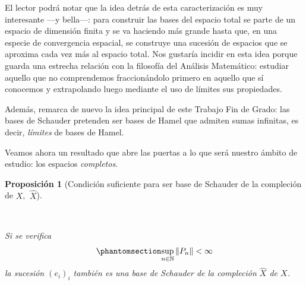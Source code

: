 \documentclass[
  spanish,
  letterpaper,
  DIV=11,
  numbers=noendperiod]{scrreprt}
\newtheorem{proposition}[theorem]{Proposición}
\theoremstyle{definition}
\theoremstyle{remark}
\theoremstyle{definition}
\theoremstyle{exampstyle}
\theoremstyle{plain}
\theoremstyle{plain}
\newtheorem{proposition}{Proposición}[chapter]
\theoremstyle{definition}
\theoremstyle{plain}
\theoremstyle{remark}
\begin{document}
El lector podrá notar que la idea detrás de esta caracterización es muy
interesante ---y bella---: para construir las bases del espacio total se
parte de un espacio de dimensión finita y se va haciendo más grande
hasta que, en una especie de convergencia espacial, se construye una
sucesión de espacios que se aproxima cada vez más al espacio total. Nos
gustaría incidir en esta idea porque guarda una estrecha relación con la
filosofía del Análisis Matemático: estudiar aquello que no comprendemos
fraccionándolo primero en aquello que sí conocemos y extrapolando luego
mediante el uso de límites sus propiedades.

Además, remarca de nuevo la idea principal de este Trabajo Fin de Grado:
las bases de Schauder pretenden ser bases de Hamel que admiten sumas
infinitas, es decir, \emph{límites} de bases de Hamel.

Veamos ahora un resultado que abre las puertas a lo que será nuestro
ámbito de estudio: los espacios \emph{completos}.

\begin{proposition}[Condición suficiente para ser base de Schauder de la
compleción de \(X\),
\(\ \widehat X\)]\protect\hypertarget{prp-1.4}{}\label{prp-1.4}

~

\hspace*{1mm}

Si se verifica
\begin{equation}\protect\phantomsection\label{eq-acotacion}{
\sup_{n\in\mathbb{N}}\|P_n\|<\infty
}\end{equation} la sucesión \((e_i)_i\) también es una base de Schauder
de la compleción \(\widehat{X}\) de \(X\).

\end{proposition}
\end{document}
